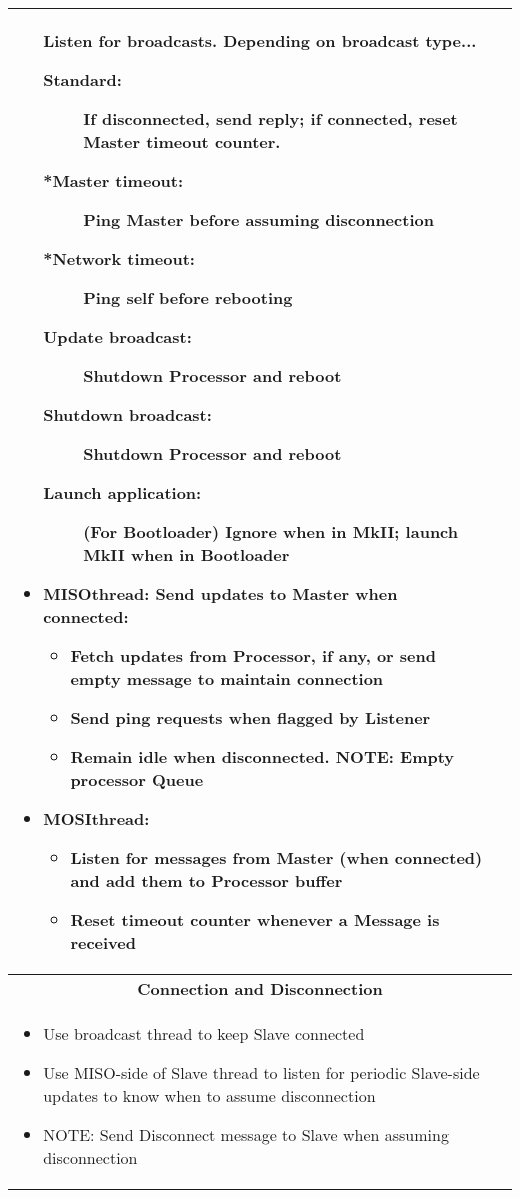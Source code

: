 \documentclass{article}
\begin{document}
\begin{center}
\begin{longtable}{| p{} | p{} |}
\begin{itemize}[leftmargin=*]
			\linebreak Listen for broadcasts. Depending on broadcast type...
			\begin{description}
				\item[Standard: ] If disconnected, send reply; if connected, reset Master
				timeout counter.
				\item[*Master timeout:] Ping Master before assuming disconnection
				\item[*Network timeout:] Ping self before rebooting
				\item[Update broadcast:] Shutdown Processor and reboot
				\item[Shutdown broadcast:] Shutdown Processor and reboot
				\item[Launch application:] (For Bootloader) Ignore when in MkII; launch
				MkII when in Bootloader
			\end{description}
		\item {MISO\hspace{.5em}thread:}
			\linebreak Send updates to Master when connected:
			\begin{itemize}
				\item Fetch updates from Processor, if any, or send empty message to
					maintain connection
				\item Send ping requests when flagged by Listener
				\item Remain idle when disconnected. NOTE: Empty processor Queue
			\end{itemize}
		\item {MOSI\hspace{.5em}thread:}
			\begin{itemize}
				\item Listen for messages from Master (when connected) and add them to
				Processor buffer
				\item Reset timeout counter whenever a Message is received
			\end{itemize}
	\end{itemize}
	\\
	\hline
	\multicolumn{2}{|c|}{\textbf{Connection and Disconnection}}\\
	\hline
	\begin{itemize}
		\item Use broadcast thread to keep Slave connected
		\item Use MISO-side of Slave thread to listen for periodic Slave-side updates
			to know when to assume disconnection
		\item NOTE: Send Disconnect message to Slave when assuming disconnection

\end{itemize}
\end{longtable}
\end{center}
\end{document}

